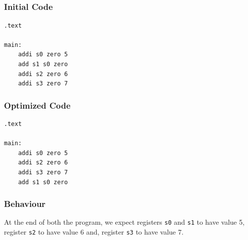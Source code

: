\documentclass[12pt, fleqn]{article}
\begin{document}
\subsection{}
\subsubsection*{Initial Code}
\begin{verbatim}
.text

main:
    addi s0 zero 5
    add s1 s0 zero
    addi s2 zero 6
    addi s3 zero 7
\end{verbatim}

\subsubsection*{Optimized Code}
\begin{verbatim}
.text

main:
    addi s0 zero 5
    addi s2 zero 6
    addi s3 zero 7
    add s1 s0 zero
\end{verbatim}

\subsubsection*{Behaviour}
At the end of both the program, we expect registers \verb!s0! and \verb!s1! to have value 5, register \verb!s2! to have value 6 and, register \verb!s3! to have value 7.
\end{document}
